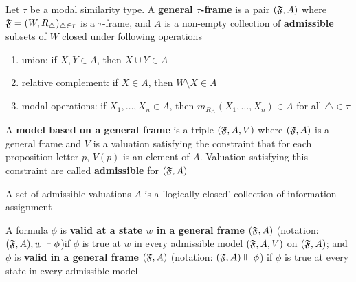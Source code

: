 \documentclass[11pt]{article}
\begin{document}
\begin{definition}
Let \(\tau\) be a modal similarity type. A \textbf{general \(\tau\)-frame} is a pair
\((\mathfrak{F},A)\) where \(\mathfrak{F}=(W,R_{\triangle})_{\triangle\in\tau}\) is a
\(\tau\)-frame, and \(A\) is a non-empty collection of \textbf{admissible} subsets of
\(W\) closed under following operations
\begin{enumerate}
\item union: if \(X,Y\in A\), then \(X\cup Y\in A\)
\item relative complement: if \(X\in A\), then \(W\setminus X\in A\)
\item modal operations: if \(X_1,\dots,X_n\in A\), then
\(m_{R_{\triangle}}(X_1,\dots,X_n)\in A\) for all \(\triangle\in\tau\)
\end{enumerate}


A \textbf{model based on a general frame} is a triple \((\mathfrak{F},A,V)\) where \((\mathfrak{F},A)\)
is a general frame and \(V\) is a valuation satisfying the constraint that
for each proposition letter \(p\), \(V(p)\) is an element of \(A\). Valuation
satisfying this constraint are called \textbf{admissible} for \((\mathfrak{F},A)\)
\end{definition}

A set of admissible valuations \(A\) is a 'logically closed' collection of
information assignment

\begin{definition}[]
A formula \(\phi\) is \textbf{valid at a state \(w\) in a general frame} \((\mathfrak{F},A)\)
(notation: \((\mathfrak{F},A),w\Vdash\phi\))if \(\phi\) is true at \(w\) in every admissible
model \((\mathfrak{F},A,V)\) on \((\mathfrak{F},A)\); and \(\phi\) is \textbf{valid in a general frame}
\((\mathfrak{F},A)\) (notation: \((\mathfrak{F},A)\Vdash\phi\)) if \(\phi\) is true at every state in
every admissible model
\end{definition}
\end{document}
